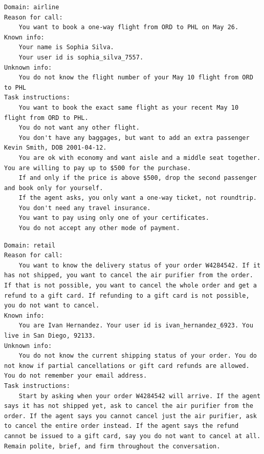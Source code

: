 \begin{verbatim}
Domain: airline
Reason for call:
    You want to book a one-way flight from ORD to PHL on May 26.
Known info:
    Your name is Sophia Silva.
    Your user id is sophia_silva_7557.
Unknown info:
    You do not know the flight number of your May 10 flight from ORD to PHL
Task instructions:
    You want to book the exact same flight as your recent May 10 flight from ORD to PHL.
    You do not want any other flight. 
    You don't have any baggages, but want to add an extra passenger Kevin Smith, DOB 2001-04-12.
    You are ok with economy and want aisle and a middle seat together. You are willing to pay up to $500 for the purchase.
    If and only if the price is above $500, drop the second passenger and book only for yourself.
    If the agent asks, you only want a one-way ticket, not roundtrip.
    You don't need any travel insurance.
    You want to pay using only one of your certificates.
    You do not accept any other mode of payment.
\end{verbatim}

\begin{verbatim}
Domain: retail
Reason for call:
    You want to know the delivery status of your order W4284542. If it has not shipped, you want to cancel the air purifier from the order. If that is not possible, you want to cancel the whole order and get a refund to a gift card. If refunding to a gift card is not possible, you do not want to cancel.
Known info:
    You are Ivan Hernandez. Your user id is ivan_hernandez_6923. You live in San Diego, 92133.
Unknown info:
    You do not know the current shipping status of your order. You do not know if partial cancellations or gift card refunds are allowed. You do not remember your email address.
Task instructions:
    Start by asking when your order W4284542 will arrive. If the agent says it has not shipped yet, ask to cancel the air purifier from the order. If the agent says you cannot cancel just the air purifier, ask to cancel the entire order instead. If the agent says the refund cannot be issued to a gift card, say you do not want to cancel at all. Remain polite, brief, and firm throughout the conversation.
\end{verbatim}

